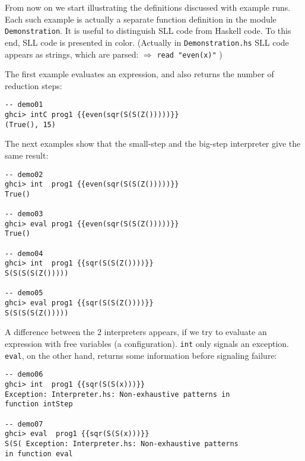 

From now on we start illustrating the definitions discussed with example runs.
Each such example is actually a separate function definition in the module \texttt{Demonstration}.
It is useful to distinguish SLL code from Haskell code.
To this end, SLL code is presented in color.
(Actually in \texttt{Demonstration.hs} SLL code appears as strings, which are parsed:
\texttt{{\color{brown}{even(x)}}} $\Rightarrow$ \texttt{read "even(x)"} )

The first example evaluates an expression, and also returns the number of reduction steps:
\begin{lstlisting}[style=demo]
-- demo01
ghci> intC prog1 {{even(sqr(S(S(Z()))))}}
(True(), 15)
\end{lstlisting}

The next examples show that the small-step and the big-step interpreter give the same result:
\begin{lstlisting}[style=demo]
-- demo02
ghci> int  prog1 {{even(sqr(S(S(Z()))))}}
True()

-- demo03
ghci> eval prog1 {{even(sqr(S(S(Z()))))}}
True()

-- demo04
ghci> int  prog1 {{sqr(S(S(Z())))}}
S(S(S(S(Z()))))

-- demo05
ghci> eval prog1 {{sqr(S(S(Z())))}}
S(S(S(S(Z()))))
\end{lstlisting}

A difference between the 2 interpreters appears, if we try to evaluate an expression
with free variables (a configuration).
\texttt{int} only signals an exception. 
\texttt{eval}, on the other hand, returns some information before signaling failure:
\begin{lstlisting}[style=demo]
-- demo06
ghci> int  prog1 {{sqr(S(S(x)))}}
Exception: Interpreter.hs: Non-exhaustive patterns in 
function intStep

-- demo07
ghci> eval  prog1 {{sqr(S(S(x)))}}
S(S( Exception: Interpreter.hs: Non-exhaustive patterns 
in function eval
\end{lstlisting}

